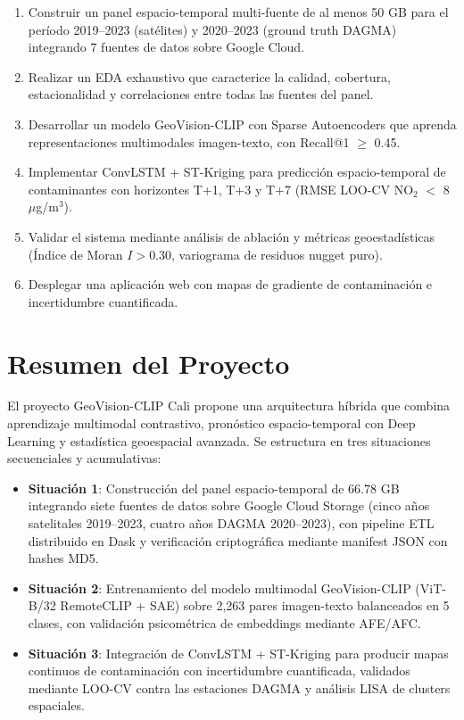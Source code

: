 \documentclass[10pt,a4paper,twocolumn]{article}
\begin{document}
\begin{enumerate}[nosep, leftmargin=*, itemsep=1pt]
  \item Construir un panel espacio-temporal multi-fuente de al menos 50 GB para el período 2019--2023 (satélites) y 2020--2023 (ground truth DAGMA) integrando 7 fuentes de datos sobre Google Cloud.
  \item Realizar un EDA exhaustivo que caracterice la calidad, cobertura, estacionalidad y correlaciones entre todas las fuentes del panel.
  \item Desarrollar un modelo GeoVision-CLIP con Sparse Autoencoders que aprenda representaciones multimodales imagen-texto, con Recall@1 $\geq$ 0.45.
  \item Implementar ConvLSTM + ST-Kriging para predicción espacio-temporal de contaminantes con horizontes T+1, T+3 y T+7 (RMSE LOO-CV NO$_2$ $<$ 8 $\mu$g/m$^3$).
  \item Validar el sistema mediante análisis de ablación y métricas geoestadísticas (Índice de Moran $I > 0.30$, variograma de residuos nugget puro).
  \item Desplegar una aplicación web con mapas de gradiente de contaminación e incertidumbre cuantificada.
\end{enumerate}

\section{Resumen del Proyecto}

El proyecto GeoVision-CLIP Cali propone una arquitectura híbrida que combina aprendizaje multimodal contrastivo, pronóstico espacio-temporal con Deep Learning y estadística geoespacial avanzada. Se estructura en tres situaciones secuenciales y acumulativas:

\begin{itemize}[nosep, leftmargin=*, itemsep=3pt]
  \item \textbf{Situación 1}: Construcción del panel espacio-temporal de 66.78 GB integrando siete fuentes de datos sobre Google Cloud Storage (cinco años satelitales 2019--2023, cuatro años DAGMA 2020--2023), con pipeline ETL distribuido en Dask y verificación criptográfica mediante manifest JSON con hashes MD5.
  \item \textbf{Situación 2}: Entrenamiento del modelo multimodal GeoVision-CLIP (ViT-B/32 RemoteCLIP + SAE) sobre 2,263 pares imagen-texto balanceados en 5 clases, con validación psicométrica de embeddings mediante AFE/AFC.
  \item \textbf{Situación 3}: Integración de ConvLSTM + ST-Kriging para producir mapas continuos de contaminación con incertidumbre cuantificada, validados mediante LOO-CV contra las estaciones DAGMA y análisis LISA de clusters espaciales.
\end{itemize}
\end{document}
